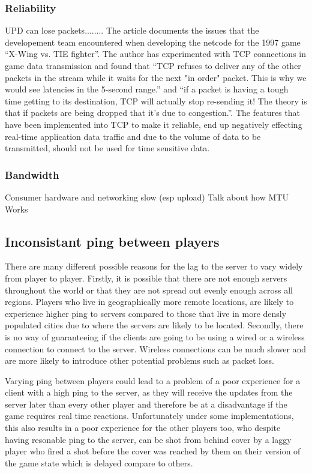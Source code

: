 \subsubsection{Reliability}
UPD can lose packets........ The article  documents the issues that the developement team encountered when developing the netcode for the 1997 game ``X-Wing vs. TIE fighter''. The author has experimented with TCP connections in game data transmission and found that ``TCP refuses to deliver any of the other packets in the stream while it waits for the next "in order" packet. This is why we would see latencies in the 5-second range.'' and ``if a packet is having a tough time getting to its destination, TCP will actually stop re-sending it! The theory is that if packets are being dropped that it's due to congestion.''. The features that have been implemented into TCP to make it reliable, end up negatively effecting real-time application data traffic and due to the volume of data to be transmitted, should not be used for time sensitive data.

\subsubsection{Bandwidth}
Consumer hardware and networking slow (esp upload)
Talk about how MTU Works

\subsection{Inconsistant ping between players}
There are many different possible reasons for the lag to the server to vary widely from player to player. Firstly, it is possible that there are not enough servers throughout the world or that they are not spread out evenly enough across all regions. Players who live in geographically more remote locations, are likely to experience higher ping to servers compared to those that live in more densly populated cities due to where the servers are likely to be located. Secondly, there is no way of guaranteeing if the clients are going to be using a wired or a wireless connection to connect to the server. Wireless connections can be much slower and are more likely to introduce other potential problems such as packet loss.

Varying ping between players could lead to a problem of a poor experience for a client with a high ping to the server, as they will receive the updates from the server later than every other player and therefore be at a disadvantage if the game requires real time reactions. Unfortunately under some implementations, this also results in a poor experience for the other players too, who despite having resonable ping to the server, can be shot from behind cover by a laggy player who fired a shot before the cover was reached by them on their version of the game state which is delayed compare to others.


